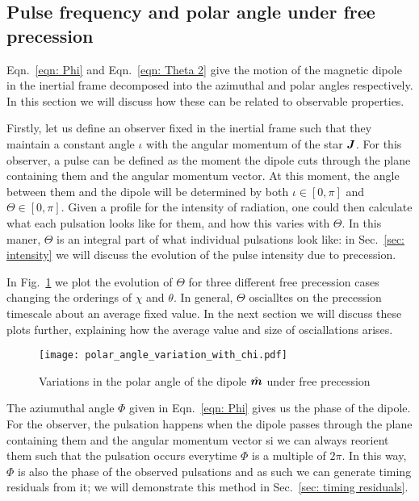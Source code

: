 \documentclass[../full_thesis/full_thesis.tex]{subfiles}
\begin{document}
\subsection{Pulse frequency and polar angle under free precession}

Eqn.~\eqref{eqn: Phi} and Eqn.~\eqref{eqn: Theta 2} give the motion of the
magnetic dipole in the inertial frame decomposed into the azimuthal and polar
angles respectively. In this section we will discuss how these can be related
to observable properties.

Firstly, let us define an observer fixed in the inertial frame such that they
maintain a constant angle $\iota$ with the angular momentum of the star $\boldsymbol{J}$.
For this observer, a pulse can be defined as the moment the dipole cuts through
the plane containing them and the angular momentum vector. At this moment, the
angle between them and the dipole will be determined by both $\iota \in [0, \pi]$ and
$\Theta \in [0, \pi]$. Given a profile for the intensity of radiation, one could then
calculate what each pulsation looks like for them, and how this varies with
$\Theta$. In this maner, $\Theta$ is an integral part of what individual
pulsations look like: in Sec.~\ref{sec: intensity} we will discuss the evolution
of the pulse intensity due to precession.

In Fig.~\ref{fig: polar angle variations} we plot the evolution of $\Theta$ for
three different free precession cases changing the orderings of $\chi$ and
$\theta$. In general, $\Theta$ oscialltes on the precession timescale about an
average fixed value. In the next section we will discuss these plots further,
explaining how the average value and size of osciallations arises.
\begin{figure}[ht]
\centering
  \texttt{[image: polar\_angle\_variation\_with\_chi.pdf]}
\caption{Variations in the polar angle of the dipole $\hat{\boldsymbol{m}}$ under free precession}
\label{fig: polar angle variations}
\end{figure}

The aziumuthal angle $\Phi$ given in Eqn.~\eqref{eqn: Phi} gives us the phase of
the dipole. For the observer, the pulsation happens when the dipole passes through
the plane containing them and the angular momentum vector si we can always reorient
them such that the pulsation occurs everytime $\Phi$ is a multiple of $2\pi$.
In this way, $\Phi$ is also the phase of the observed pulsations and as such
we can generate timing residuals from it; we will demonstrate this method in
Sec.~\ref{sec: timing residuals}.
\end{document}

